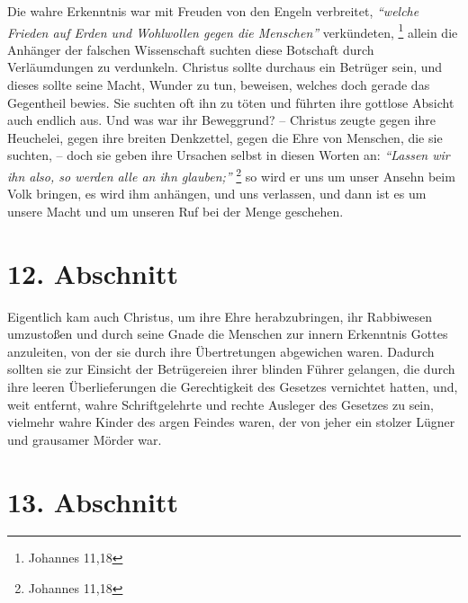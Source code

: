 Die wahre Erkenntnis war mit Freuden von den
Engeln verbreitet,  \textit{"`welche Frieden auf Erden
und Wohlwollen gegen die Menschen"'}
verkündeten,
\footnote{Johannes 11,18}
allein die Anhänger der falschen Wissenschaft
suchten diese Botschaft durch Verläumdungen zu verdunkeln. Christus sollte
durchaus ein Betrüger sein, und dieses sollte seine Macht, Wunder
zu tun,
beweisen, welches doch gerade das Gegentheil bewies. Sie suchten oft ihn zu
töten und führten ihre gottlose Absicht auch endlich aus. Und was war ihr
Beweggrund? -- Christus zeugte gegen ihre Heuchelei, gegen ihre
breiten
Denkzettel, gegen die Ehre von Menschen, die sie suchten, -- doch sie geben ihre
Ursachen selbst in diesen Worten an:
\textit{"`Lassen wir ihn also, so werden alle an ihn glauben;"'}
\footnote{Johannes 11,18}
so wird er uns um unser Ansehn beim Volk
bringen, es wird ihm anhängen, und uns verlassen, und dann ist es um unsere
Macht und um unseren Ruf bei der Menge geschehen.

\section{12. Abschnitt} \label{kap7_ab12}

Eigentlich kam auch Christus, um ihre Ehre herabzubringen, ihr Rabbiwesen
umzustoßen und durch seine Gnade die Menschen zur innern Erkenntnis Gottes
anzuleiten, von der sie durch ihre Übertretungen abgewichen waren. Dadurch
sollten sie zur Einsicht der Betrügereien ihrer blinden
Führer gelangen, die
durch ihre leeren Überlieferungen die Gerechtigkeit des
Gesetzes vernichtet
hatten, und, weit entfernt, wahre Schriftgelehrte und rechte Ausleger des
Gesetzes zu sein, vielmehr wahre Kinder des argen Feindes waren, der von jeher
ein stolzer Lügner und grausamer Mörder war.

\section{13. Abschnitt} \label{kap7_ab13}

